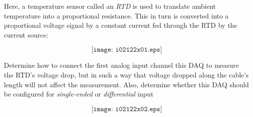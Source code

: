

Here, a temperature sensor called an {\it RTD} is used to translate ambient temperature into a proportional resistance.  This in turn is converted into a proportional voltage signal by a constant current fed through the RTD by the current source:

$$\texttt{[image: i02122x01.eps]}$$

Determine how to connect the first analog input channel this DAQ to measure the RTD's voltage drop, but in such a way that voltage dropped along the cable's length will not affect the measurement.  Also, determine whether this DAQ should be configured for {\it single-ended} or {\it differential} input







$$\texttt{[image: i02122x02.eps]}$$











